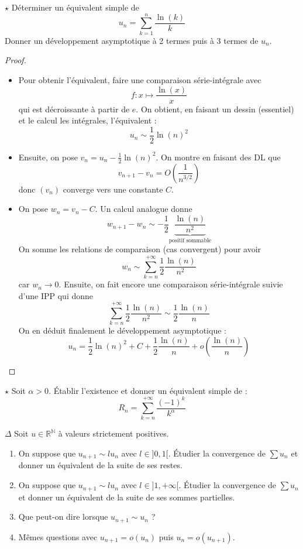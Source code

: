 \documentclass[french,a4paper]{article}
\newcommand{\N}{\mathbb{N}}
\newcommand{\R}{\mathbb{R}}
\theoremstyle{plain}
\theoremstyle{definition}
\theoremstyle{remark}
\begin{document}
\begin{ex}{$\star$}
	Déterminer un équivalent simple de $$u_n=\sum_{k=1}^{n}\frac{\ln(k)}{k}$$ Donner un développement asymptotique à 2 termes puis à 3 termes de $u_n$.
\end{ex}
\begin{proof}
	\begin{itemize}
		\item Pour obtenir l'équivalent, faire une comparaison série-intégrale  avec $$f:x\mapsto\frac{\ln(x)}{x}$$ qui est décroissante à partir de $e$. On obtient, en faisant un dessin (essentiel) et le calcul les intégrales, l'équivalent : $$u_n\sim\frac{1}{2}\ln(n)^2$$
		\item  Ensuite, on pose $v_n=u_n-\displaystyle\frac{1}{2}\ln(n)^2$. On montre en faisant des DL que $$v_{n+1}-v_n=O\left(\frac{1}{n^{3/2}}\right)$$ donc $(v_n)$ converge vers une constante $C$.
		\item On pose $w_n=v_n-C$. Un calcul analogue donne $$w_{n+1}-w_n\sim-\frac{1}{2}\underbrace{\frac{\ln(n)}{n^2}}_{\text{positif sommable}}$$ On somme les relations de comparaison (cas convergent) pour avoir $$w_n\sim\sum_{k=n}^{+\infty}\frac{1}{2}\frac{\ln(n)}{n^2}$$ car $w_n\to 0$. Ensuite, on fait encore une comparaison série-intégrale suivie d'une IPP qui donne $$\sum_{k=n}^{+\infty}\frac{1}{2}\frac{\ln(n)}{n^2}\sim\frac{1}{2}\frac{\ln(n)}{n}$$ On en déduit finalement le développement asymptotique : $$u_n=\frac{1}{2}\ln(n)^2+C+\frac{1}{2}\frac{\ln(n)}{n}+o\left(\frac{\ln(n)}{n}\right)$$
	\end{itemize}
\end{proof}

\begin{ex}{$\star$}
	Soit $\alpha>0$. Établir l'existence et donner un équivalent simple de : $$R_n=\sum_{k=n}^{+\infty}\frac{(-1)^k}{k^\alpha}$$
\end{ex}

\begin{ex}{$\Delta$}
	Soit $u\in\R^\N$ à valeurs strictement positives.
	\begin{enumerate}
		\item On suppose que $u_{n+1}\sim l u_n$ avec $l\in]0,1[$. Étudier la convergence de $\sum u_n$ et donner un équivalent de la suite de ses restes.
		\item On suppose que $u_{n+1}\sim l u_n$ avec $l\in]1,+\infty[$. Étudier la convergence de $\sum u_n$ et donner un équivalent de la suite de ses sommes partielles.
		\item Que peut-on dire lorsque $u_{n+1}\sim u_n$ ?
		\item Mêmes questions avec $u_{n+1}=o(u_n)$ puis $u_n=o(u_{n+1})$.
	\end{enumerate}
\end{ex}
\end{document}
